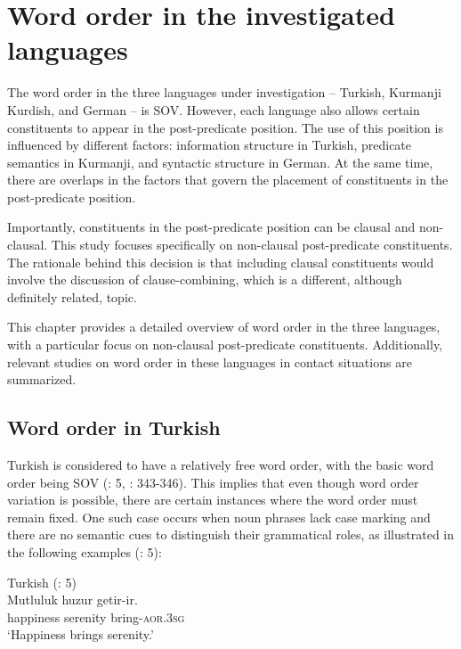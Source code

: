 \chapter{Word order in the investigated languages}\label{chap:key:3}

The word order in the three languages under investigation -- Turkish, Kurmanji Kurdish, and German -- is SOV. However, each language also allows certain constituents to appear in the post-predicate position. The use of this position is influenced by different factors: information structure in Turkish, predicate semantics in Kurmanji, and syntactic structure in German. At the same time, there are overlaps in the factors that govern the placement of constituents in the post-predicate position.

Importantly, constituents in the post-predicate position can be clausal and non-clausal. This study focuses specifically on non-clausal post-predicate constituents. The rationale behind this decision is that including clausal constituents would involve the discussion of clause-combining, which is a different, although definitely related, topic.

This chapter provides a detailed overview of word order in the three languages, with a particular focus on non-clausal post-predicate constituents. Additionally, relevant studies on word order in these languages in contact situations are summarized.

\section{Word order in Turkish} \label{sec:key:3.1}

Turkish is considered to have a relatively free word order, with the basic word order being SOV (\citealt{Erguvanli1984}: 5, \citealt{GokselKerslake2004}: 343-346). This implies that even though word order variation is possible, there are certain instances where the word order must remain fixed. One such case occurs when noun phrases lack case marking and there are no semantic cues to distinguish their grammatical roles, as illustrated in the following examples (\citealt{Erguvanli1984}: 5):

\ea\label{ex:key:1} Turkish (\citealt{Erguvanli1984}: 5)\\
\gll Mutluluk   huzur    getir-ir.\\
happiness  serenity  bring\textsc{-aor.3\textsc{sg}}\\
\glt ‘Happiness brings serenity.’
  \z

